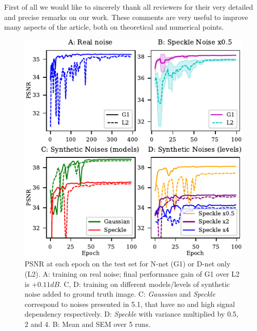 \documentclass{article}
\begin{document}

First of all we would like to sincerely thank all reviewers for their very detailed and precise remarks on our work. These comments are very useful to improve many aspects of the article, both on theoretical and numerical points.
\begin{figure}[H]
\vskip -0.1in
\begin{center}
\includegraphics[width=\columnwidth]{fig_review.pdf}
\vskip -0.15in
\caption{PSNR at each epoch on the test set for N-net (G1) or D-net only (L2). A: training on real noise; final performance gain of G1 over L2 is $+0.11dB$. C, D: training on different models/levels of synthetic noise added to ground truth image. C: \textit{Gaussian} and \textit{Speckle} correspond to noises presented in 5.1, that have no and high signal dependency respectively. D: \textit{Speckle} with variance multiplied by 0.5, 2 and 4. B: Mean and SEM over 5 runs.}
\label{fig:review}
\end{center}
\vskip -0.25in
\end{figure}
\end{document}
